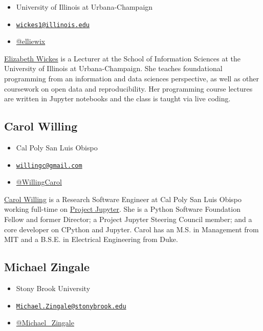 \documentclass[]{book}
\providecommand{\tightlist}{%
  \setlength{\itemsep}{0pt}\setlength{\parskip}{0pt}}
\begin{document}
\begin{itemize}
\tightlist
\item
  University of Illinois at Urbana-Champaign
\item
  \href{mailto:wickes1@illinois.edu}{\nolinkurl{wickes1@illinois.edu}}
\item
  \href{https://twitter.com/elliewix}{@elliewix}
\end{itemize}

\href{https://ischool.illinois.edu/people/elizabeth-wickes}{Elizabeth Wickes} is a Lecturer
at the School of Information Sciences at the University of Illinois at Urbana-Champaign.
She teaches foundational programming from an information and data sciences perspective,
as well as other coursework on open data and reproducibility. Her programming course
lectures are written in Jupyter notebooks and the class is taught via live coding.

\hypertarget{carol-willing}{%
\subsection*{Carol Willing}\label{carol-willing}}

\begin{itemize}
\tightlist
\item
  Cal Poly San Luis Obispo
\item
  \href{mailto:willingc@gmail.com}{\nolinkurl{willingc@gmail.com}}
\item
  \href{https://twitter.com/WillingCarol}{@WillingCarol}
\end{itemize}

\href{https://www.willingconsulting.com/about/}{Carol Willing} is a Research Software Engineer
at Cal Poly San Luis Obispo working full-time on \href{https://jupyter.org/}{Project Jupyter}.
She is a Python Software Foundation Fellow and former Director; a Project Jupyter
Steering Council member; and a core developer on CPython and Jupyter. Carol has an
M.S. in Management from MIT and a B.S.E. in Electrical Engineering from Duke.

\hypertarget{michael-zingale}{%
\subsection*{Michael Zingale}\label{michael-zingale}}

\begin{itemize}
\tightlist
\item
  Stony Brook University
\item
  \href{mailto:Michael.Zingale@stonybrook.edu}{\nolinkurl{Michael.Zingale@stonybrook.edu}}
\item
  \href{https://twitter.com/Michael_Zingale}{@Michael\_Zingale}
\end{itemize}
\end{document}
